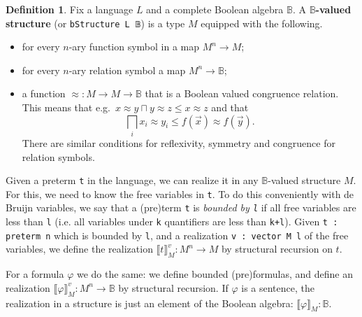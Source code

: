 \documentclass[sigplan,screen]{acmart}
\newcommand{\B}{\mathbb{B}}
\newcommand{\lil}{\lstinline}
\theoremstyle{definition}
\newtheorem{defn}{Definition}[section]
\begin{document}
\begin{defn}\label{def:boolean-valued-structure}
  Fix a language $L$ and a complete Boolean algebra $\B$. A \textbf{$\B$-valued structure} (or \lil{bStructure L 𝔹}) is a type $M$ equipped with the following.
  \begin{itemize}
    \item for every $n$-ary function symbol in a map $M^n \to M$;
    \item for every $n$-ary relation symbol a map $M^n \to \B$;
    \item a function ${\approx}:M\to M\to\B$ that is a Boolean valued congruence relation. This means that e.g.\
    $x\approx y\sqcap y\approx z\le x\approx z$ and that \[\bigsqcap_i x_i\approx y_i \le f(\vec x)\approx f(\vec y).\]
    There are similar conditions for reflexivity, symmetry and congruence for relation symbols.
  \end{itemize}
\end{defn}

Given a preterm \lil{t} in the language, we can realize it in any $\B$-valued structure $M$.
For this, we need to know the free variables in \lil{t}.
To do this conveniently with de Bruijn variables, we say that a (pre)term \lil{t} is \emph{bounded by \lil{l}} if all free variables are less than \lil{l} (i.e. all variables under \lil{k} quantifiers are less than \lil{k+l}).
Given \lil{t : preterm n} which is bounded by \lil{l}, and a realization \lil{v : vector M l} of the free variables, we define the realization $\llbracket t \rrbracket_M^v : M^n \to M$ by structural recursion on $t$.

For a formula $\varphi$ we do the same: we define bounded (pre)formulas, and define an realization $\llbracket \varphi \rrbracket_M^v : M^n \to \B$ by structural recursion.
If $\varphi$ is a sentence, the realization in a structure is just an element of the Boolean algebra: $\llbracket \varphi \rrbracket_M : \B$.
\end{document}
